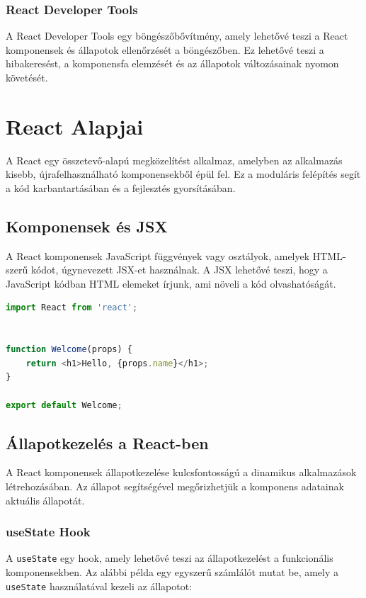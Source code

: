 \documentclass[colorlinks]{thesis-kando}
\theoremstyle{definition}
\theoremstyle{remark}
\begin{document}
\subsubsection{React Developer Tools}
A React Developer Tools egy böngészőbővítmény, amely lehetővé teszi a React komponensek és állapotok ellenőrzését a böngészőben. Ez lehetővé teszi a hibakeresést, a komponensfa elemzését és az állapotok változásainak nyomon követését.

\section{React Alapjai}
A React egy összetevő-alapú megközelítést alkalmaz, amelyben az alkalmazás kisebb, újrafelhasználható komponensekből épül fel. Ez a moduláris felépítés segít a kód karbantartásában és a fejlesztés gyorsításában.

\subsection{Komponensek és JSX}
A React komponensek JavaScript függvények vagy osztályok, amelyek HTML-szerű kódot, úgynevezett JSX-et használnak. A JSX lehetővé teszi, hogy a JavaScript kódban HTML elemeket írjunk, ami növeli a kód olvashatóságát.

\pagebreak

\begin{lstlisting}[language=JavaScript]
import React from 'react';


function Welcome(props) {
    return <h1>Hello, {props.name}</h1>;
}

export default Welcome;
\end{lstlisting}

\subsection{Állapotkezelés a React-ben}
A React komponensek állapotkezelése kulcsfontosságú a dinamikus alkalmazások létrehozásában. Az állapot segítségével megőrizhetjük a komponens adatainak aktuális állapotát.

\subsubsection{useState Hook}
A \texttt{useState} egy hook, amely lehetővé teszi az állapotkezelést a funkcionális komponensekben. Az alábbi példa egy egyszerű számlálót mutat be, amely a \texttt{useState} használatával kezeli az állapotot:
\end{document}
